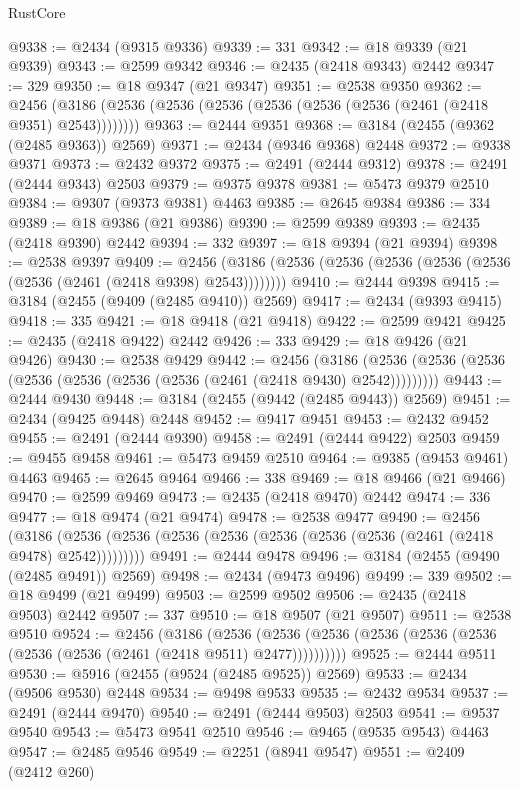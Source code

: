 \begin{lexlean}{RustCore}
\begin{coremodule}
@9338 := @2434 (@9315 @9336)
@9339 := 331
@9342 := @18 @9339 (@21 @9339)
@9343 := @2599 @9342
@9346 := @2435 (@2418 @9343) @2442
@9347 := 329
@9350 := @18 @9347 (@21 @9347)
@9351 := @2538 @9350
@9362 := @2456 (@3186 (@2536 (@2536 (@2536 (@2536 (@2536 (@2536 (@2461 (@2418 @9351) @2543))))))))
@9363 := @2444 @9351
@9368 := @3184 (@2455 (@9362 (@2485 @9363)) @2569)
@9371 := @2434 (@9346 @9368) @2448
@9372 := @9338 @9371
@9373 := @2432 @9372
@9375 := @2491 (@2444 @9312)
@9378 := @2491 (@2444 @9343) @2503
@9379 := @9375 @9378
@9381 := @5473 @9379 @2510
@9384 := @9307 (@9373 @9381) @4463
@9385 := @2645 @9384
@9386 := 334
@9389 := @18 @9386 (@21 @9386)
@9390 := @2599 @9389
@9393 := @2435 (@2418 @9390) @2442
@9394 := 332
@9397 := @18 @9394 (@21 @9394)
@9398 := @2538 @9397
@9409 := @2456 (@3186 (@2536 (@2536 (@2536 (@2536 (@2536 (@2536 (@2461 (@2418 @9398) @2543))))))))
@9410 := @2444 @9398
@9415 := @3184 (@2455 (@9409 (@2485 @9410)) @2569)
@9417 := @2434 (@9393 @9415)
@9418 := 335
@9421 := @18 @9418 (@21 @9418)
@9422 := @2599 @9421
@9425 := @2435 (@2418 @9422) @2442
@9426 := 333
@9429 := @18 @9426 (@21 @9426)
@9430 := @2538 @9429
@9442 := @2456
    (@3186 (@2536 (@2536 (@2536 (@2536 (@2536 (@2536 (@2536 (@2461 (@2418 @9430) @2542)))))))))
@9443 := @2444 @9430
@9448 := @3184 (@2455 (@9442 (@2485 @9443)) @2569)
@9451 := @2434 (@9425 @9448) @2448
@9452 := @9417 @9451
@9453 := @2432 @9452
@9455 := @2491 (@2444 @9390)
@9458 := @2491 (@2444 @9422) @2503
@9459 := @9455 @9458
@9461 := @5473 @9459 @2510
@9464 := @9385 (@9453 @9461) @4463
@9465 := @2645 @9464
@9466 := 338
@9469 := @18 @9466 (@21 @9466)
@9470 := @2599 @9469
@9473 := @2435 (@2418 @9470) @2442
@9474 := 336
@9477 := @18 @9474 (@21 @9474)
@9478 := @2538 @9477
@9490 := @2456
    (@3186 (@2536 (@2536 (@2536 (@2536 (@2536 (@2536 (@2536 (@2461 (@2418 @9478) @2542)))))))))
@9491 := @2444 @9478
@9496 := @3184 (@2455 (@9490 (@2485 @9491)) @2569)
@9498 := @2434 (@9473 @9496)
@9499 := 339
@9502 := @18 @9499 (@21 @9499)
@9503 := @2599 @9502
@9506 := @2435 (@2418 @9503) @2442
@9507 := 337
@9510 := @18 @9507 (@21 @9507)
@9511 := @2538 @9510
@9524 := @2456
    (@3186
      (@2536 (@2536 (@2536 (@2536 (@2536 (@2536 (@2536 (@2536 (@2461 (@2418 @9511) @2477))))))))))
@9525 := @2444 @9511
@9530 := @5916 (@2455 (@9524 (@2485 @9525)) @2569)
@9533 := @2434 (@9506 @9530) @2448
@9534 := @9498 @9533
@9535 := @2432 @9534
@9537 := @2491 (@2444 @9470)
@9540 := @2491 (@2444 @9503) @2503
@9541 := @9537 @9540
@9543 := @5473 @9541 @2510
@9546 := @9465 (@9535 @9543) @4463
@9547 := @2485 @9546
@9549 := @2251 (@8941 @9547)
@9551 := @2409 (@2412 @260)

\end{coremodule}
\end{lexlean}

